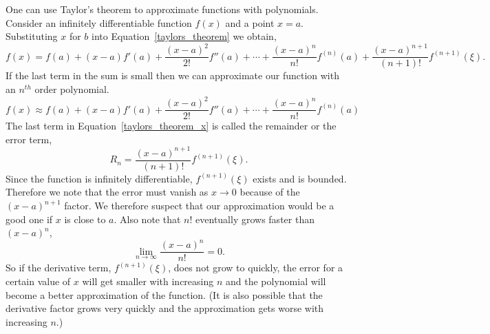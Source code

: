 One can use Taylor's theorem to approximate functions with polynomials.
Consider an infinitely differentiable function $f(x)$ and a point $x = a$.  
Substituting $x$ for $b$ into Equation~\ref{taylors_theorem} we obtain,
\[
\label{taylors_theorem_x}
f(x) = f(a) + (x-a) f'(a) + \frac{(x-a)^2}{2!} f''(a) + \cdots + 
\frac{(x-a)^n}{n!} f^{(n)}(a) 
+ \frac{(x-a)^{n+1}}{(n+1)!} f^{(n+1)}(\xi).
\]
If the last term in the sum is small then we can approximate our function
with an $n^{th}$ order polynomial.
\[
f(x) \approx f(a) + (x-a) f'(a) + \frac{(x-a)^2}{2!} f''(a) + \cdots + 
\frac{(x-a)^n}{n!} f^{(n)}(a) 
\]
The last term in Equation~\ref{taylors_theorem_x} is called the remainder
or the error term,
\[
R_n = \frac{(x-a)^{n+1}}{(n+1)!} f^{(n+1)}(\xi).
\]
Since the function is infinitely differentiable, $f^{(n+1)}(\xi)$ exists and
is bounded.  Therefore we note that the error must vanish as $x \to 0$ 
because of the $(x-a)^{n+1}$ factor.  We therefore suspect that our 
approximation would be a good one if $x$ is close to $a$.  Also note that
$n!$ eventually grows faster than $(x-a)^n$,
\[
\lim_{n \to \infty} \frac{(x-a)^n}{n!} = 0.
\]
So if the derivative term, $f^{(n+1)}(\xi)$, does not grow to quickly, the
error for a certain value of $x$ will get smaller with increasing $n$ and
the polynomial will become a better approximation of the function.
(It is also possible that the derivative factor grows very quickly and 
the approximation gets worse with increasing $n$.)




